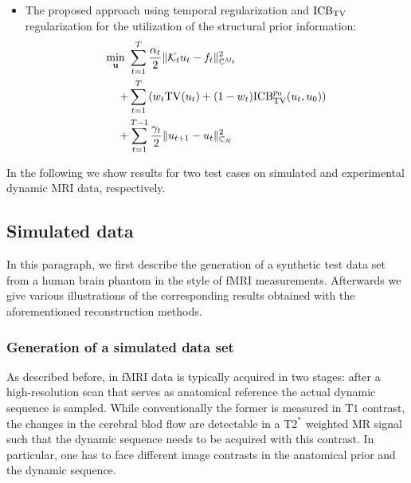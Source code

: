 \begin{itemize}
\item The proposed approach using temporal regularization and $\mathrm{ICB}_{\mathrm{TV}}$ regularization for the utilization of the structural prior information:
\begin{alignat}{4} \label{icbtv}
\min_{\mathbf{u}} ~  &\sum_{t=1}^T \frac{\alpha_t}{2} \| \mathcal{K}_t u_t - f_t \|_{\mathbb{C}^{M_t}}^2 \notag\\
+ &\sum_{t=1}^T \left(w_t \mathrm{TV}(u_t) + (1-w_t) \mathrm{ICB}_{\mathrm{TV}}^{p_0}(u_t,u_0) \right)  \notag\\
+ &\sum_{t=1}^{T-1} \frac{\gamma_t}{2} \|u_{t+1} - u_t \|_{\mathbb{C}_N}^2 
\end{alignat}
\end{itemize}
In the following we show results for two test cases on simulated and experimental dynamic MRI data, respectively.

\subsection{Simulated data}
\label{subsec:artifical data}
In this paragraph, we first describe the generation of a synthetic test data set from a human brain phantom in the style of fMRI measurements. Afterwards we give various illustrations of the corresponding results obtained with the aforementioned reconstruction methods.  

\subsubsection{Generation of a simulated data set}
As described before, in fMRI data is typically acquired in two stages: after a high-resolution scan that serves as anatomical reference the actual dynamic sequence is sampled. 
While conventionally the former is measured in T$1$ contrast, the changes in the cerebral blod flow are detectable in a T$2^*$ weighted MR signal such that the dynamic sequence needs to be acquired with this contrast. 
In particular, one has to face different image contrasts in the anatomical prior and the dynamic sequence.

